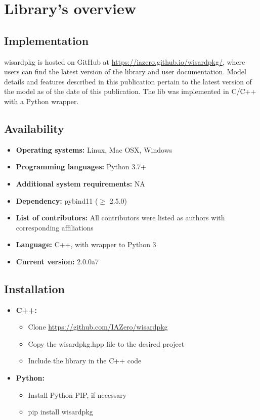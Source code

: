 \documentclass[12pt]{article}
\begin{document}
\section{Library's overview}

\subsection{Implementation}



wisardpkg is hosted on GitHub at \hyperlink{https://iazero.github.io/wisardpkg/}{https://iazero.github.io/wisardpkg/}, where users can find the latest version of the library and user documentation. Model details and features described in this publication pertain to the latest version of the model as of the date of this publication. The lib was implemented in C/C++ with a Python wrapper.

\subsection{Availability}

\begin{itemize}
    \item \textbf{Operating systems:} Linux, Mac OSX, Windows
    \item \textbf{Programming languages:} Python 3.7+
    \item \textbf{Additional system requirements:} NA
    \item \textbf{Dependency:} pybind11 ($\geq$ 2.5.0)
    \item \textbf{List of contributors:} All contributors were listed as authors with corresponding affiliations
    \item \textbf{Language:} C++, with wrapper to Python 3
    \item \textbf{Current version:} 2.0.0a7

\end{itemize}

\subsection{Installation}

\begin{itemize}
    \item \textbf{C++:}
          \begin{itemize}
              \item Clone \hyperlink{https://github.com/IAZero/wisardpkg}{https://github.com/IAZero/wisardpkg}
              \item Copy the wisardpkg.hpp file to the desired project
              \item Include the library in the C++ code
          \end{itemize}
    \item \textbf{Python:}
          \begin{itemize}
              \item Install Python PIP, if necessary
              \item pip install wisardpkg
          \end{itemize}
\end{itemize}
\end{document}
